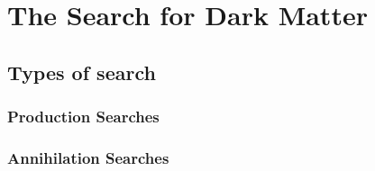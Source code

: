 

\chapter{The Search for Dark Matter}

\section{Types of search}


\subsection{Production Searches}


\subsection{Annihilation Searches}

